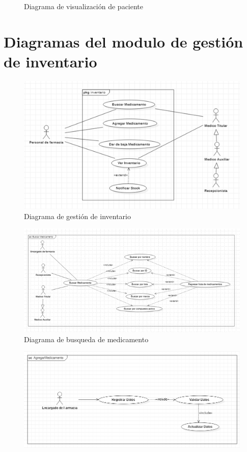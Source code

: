 \documentclass[12pt,letterpaper]{article}
\begin{document}
{\begin{figure}[H]
            \caption{Diagrama de visualización de paciente}
        \end{figure}
        
        \newpage
    \section{Diagramas del modulo de gestión de inventario}
        \begin{figure}[H]
            \centering
            \includegraphics [scale=0.8]{gestionInventario}
            \caption{Diagrama de gestión de inventario}
        \end{figure}
        \begin{figure}[H]
            \centering
            \includegraphics [scale=0.9]{buscarMedicamentos}
            \caption{Diagrama de busqueda de medicamento}
        \end{figure}
        \begin{figure}[H]
            \centering
            \includegraphics [scale=0.5]{agregarMedicamento}

\end{figure}}
\end{document}
